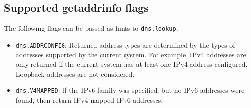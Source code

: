 \subsection{Supported getaddrinfo
flags}\label{supported-getaddrinfo-flags}

The following flags can be passed as hints to \texttt{dns.lookup}.

\begin{itemize}
\itemsep1pt\parskip0pt
\item
  \texttt{dns.ADDRCONFIG}: Returned address types are determined by the
  types of addresses supported by the current system. For example, IPv4
  addresses are only returned if the current system has at least one
  IPv4 address configured. Loopback addresses are not considered.
\item
  \texttt{dns.V4MAPPED}: If the IPv6 family was specified, but no IPv6
  addresses were found, then return IPv4 mapped IPv6 addresses.
\end{itemize}
